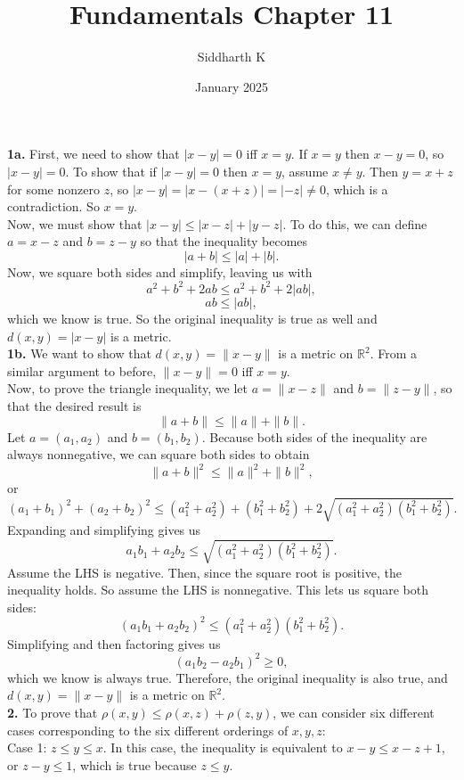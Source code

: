 \documentclass{article}
\title{Fundamentals Chapter 11}
\author{Siddharth K}
\date{January 2025}
\newcommand{\R}{\mathbb{R}}
\begin{document}
\maketitle

\textbf{1a.} First, we need to show that $|x - y| = 0$ iff $x = y$. If $x = y$ then $x - y = 0$, so $|x - y| = 0$. To show that if $|x - y| = 0$ then $x = y$, assume $x \neq y$. Then $y = x + z$ for some nonzero $z$, so $|x - y| = |x - (x + z)| = |-z| \neq 0$, which is a contradiction. So $x = y$. \\

Now, we must show that $|x - y| \le |x - z| + |y - z|$. To do this, we can define $a = x - z$ and $b = z - y$ so that the inequality becomes
$$|a + b| \le |a| + |b|.$$
Now, we square both sides and simplify, leaving us with
$$a^2 + b^2 + 2ab \le a^2 + b^2 + 2|ab|,$$
$$ab \le |ab|,$$
which we know is true. So the original inequality is true as well and $d(x, y) = |x - y|$ is a metric. \\

\textbf{1b.} We want to show that $d(x, y) = \|x - y\|$ is a metric on $\R^2$. From a similar argument to before, $\|x - y\| = 0$ iff $x = y$. \\

Now, to prove the triangle inequality, we let $a = \|x - z\|$ and $b = \|z - y\|$, so that the desired result is
$$\|a + b\| \le \|a\| + \|b\|.$$
Let $a = (a_1, a_2)$ and $b = (b_1, b_2)$. Because both sides of the inequality are always nonnegative, we can square both sides to obtain
$$\|a + b\|^2 \le \|a\|^2 + \|b\|^2,$$
or
$$(a_1 + b_1)^2 + (a_2 + b_2)^2 \le (a_1^2 + a_2^2) + (b_1^2 + b_2^2) + 2\sqrt{(a_1^2 + a_2^2)(b_1^2 + b_2^2)}.$$
Expanding and simplifying gives us
$$a_1b_1 + a_2b_2 \le \sqrt{(a_1^2 + a_2^2)(b_1^2 + b_2^2)}.$$
Assume the LHS is negative. Then, since the square root is positive, the inequality holds. So assume the LHS is nonnegative. This lets us square both sides:
$$(a_1b_1 + a_2b_2)^2 \le (a_1^2 + a_2^2)(b_1^2 + b_2^2).$$
Simplifying and then factoring gives us
$$(a_1b_2 - a_2b_1)^2 \ge 0,$$
which we know is always true. Therefore, the original inequality is also true, and $d(x, y) = \|x - y\|$ is a metric on $\R^2$. \\

\textbf{2.} To prove that $\rho(x, y) \le \rho(x, z) + \rho(z, y)$, we can consider six different cases corresponding to the six different orderings of $x, y, z$: \\

Case 1: $z \le y \le x$. In this case, the inequality is equivalent to $x - y \le x - z + 1$, or $z - y \le 1$, which is true because $z \le y$. \\
\end{document}
